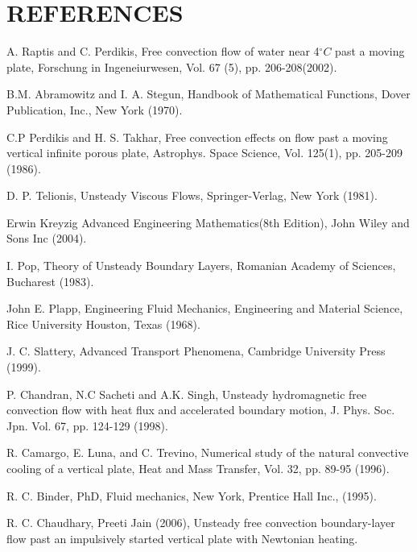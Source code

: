 \documentclass[11pt]{report}
\begin{document}
	\chapter*{REFERENCES}
	\begin{description}
		\item A. Raptis and C. Perdikis, Free convection flow of water near 4$^\circ C$ past a moving plate, Forschung in Ingeneiurwesen, Vol. 67 (5), pp. 206-208(2002).
		
		\item B.M. Abramowitz and I. A. Stegun, Handbook of Mathematical Functions, Dover Publication, Inc., New York (1970).
		
		\item C.P Perdikis and H. S. Takhar, Free convection effects on flow past a moving vertical infinite porous plate, Astrophys.  Space Science, Vol. 125(1), pp. 205-209 (1986).
		
		\item D. P. Telionis, Unsteady Viscous Flows, Springer-Verlag, New York (1981).
		
		\item Erwin Kreyzig Advanced Engineering Mathematics(8th Edition), John Wiley and Sons Inc (2004).
		
		\item I. Pop, Theory of Unsteady Boundary Layers, Romanian Academy of Sciences, Bucharest (1983).
		
		\item John E. Plapp, Engineering Fluid Mechanics, Engineering and Material Science, Rice University Houston, Texas (1968).
		
		\item J. C. Slattery, Advanced Transport Phenomena, Cambridge University Press (1999).
		
		\item P. Chandran, N.C Sacheti and A.K. Singh, Unsteady hydromagnetic free convection flow with heat flux and accelerated boundary motion, J. Phys. Soc. Jpn. Vol. 67, pp. 124-129 (1998).
		
		\item R. Camargo, E. Luna, and C. Trevino, Numerical study of the natural convective cooling of a vertical plate, Heat and Mass Transfer, Vol. 32, pp. 89-95 (1996).
		
		\item R. C. Binder, PhD, Fluid mechanics, New York, Prentice Hall Inc., (1995).
		
		\item R. C. Chaudhary, Preeti Jain (2006), Unsteady free convection boundary-layer flow past an impulsively started vertical plate with Newtonian heating.
		

\end{description}
\end{document}

